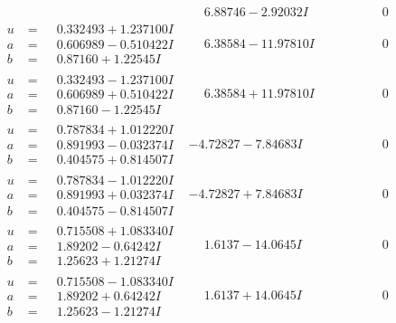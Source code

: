 \documentclass[1p]{elsarticle_modified}
\theoremstyle{definition}
\begin{document}
$$\begin{array}{c|c|c}
 & \phantom{-}6.88746 - 2.92032 I & \phantom{-0.000000 } 0 \\ \hline\begin{aligned}
u &= \phantom{-}0.332493 + 1.237100 I \\
a &= \phantom{-}0.606989 - 0.510422 I \\
b &= \phantom{-}0.87160 + 1.22545 I\end{aligned}
 & \phantom{-}6.38584 - 11.97810 I & \phantom{-0.000000 } 0 \\ \hline\begin{aligned}
u &= \phantom{-}0.332493 - 1.237100 I \\
a &= \phantom{-}0.606989 + 0.510422 I \\
b &= \phantom{-}0.87160 - 1.22545 I\end{aligned}
 & \phantom{-}6.38584 + 11.97810 I & \phantom{-0.000000 } 0 \\ \hline\begin{aligned}
u &= \phantom{-}0.787834 + 1.012220 I \\
a &= \phantom{-}0.891993 - 0.032374 I \\
b &= \phantom{-}0.404575 + 0.814507 I\end{aligned}
 & -4.72827 - 7.84683 I & \phantom{-0.000000 } 0 \\ \hline\begin{aligned}
u &= \phantom{-}0.787834 - 1.012220 I \\
a &= \phantom{-}0.891993 + 0.032374 I \\
b &= \phantom{-}0.404575 - 0.814507 I\end{aligned}
 & -4.72827 + 7.84683 I & \phantom{-0.000000 } 0 \\ \hline\begin{aligned}
u &= \phantom{-}0.715508 + 1.083340 I \\
a &= \phantom{-}1.89202 - 0.64242 I \\
b &= \phantom{-}1.25623 + 1.21274 I\end{aligned}
 & \phantom{-}1.6137 - 14.0645 I & \phantom{-0.000000 } 0 \\ \hline\begin{aligned}
u &= \phantom{-}0.715508 - 1.083340 I \\
a &= \phantom{-}1.89202 + 0.64242 I \\
b &= \phantom{-}1.25623 - 1.21274 I\end{aligned}
 & \phantom{-}1.6137 + 14.0645 I & \phantom{-0.000000 } 0 \\ \hline\begin{aligned}

\end{aligned}
\end{array}$$
\end{document}
